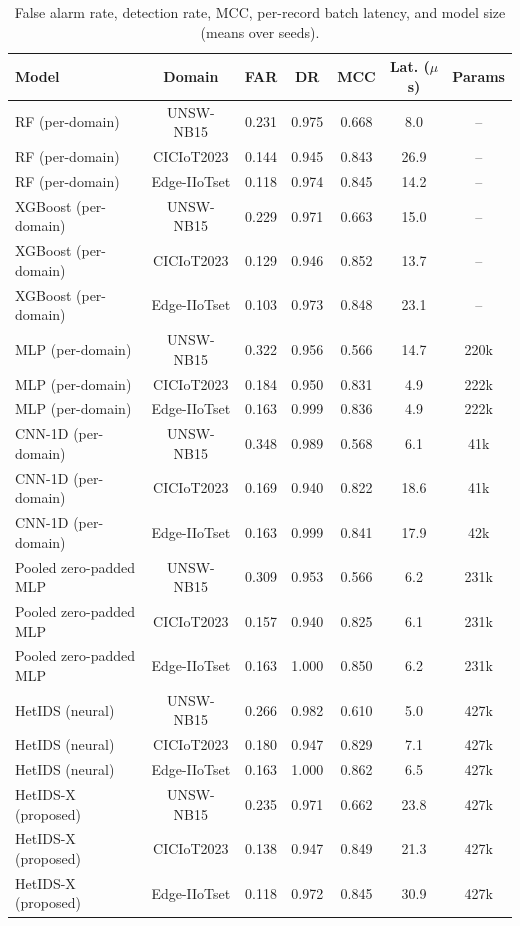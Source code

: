 \begin{table}[htbp]\centering\scriptsize
\caption{False alarm rate, detection rate, MCC, per-record batch latency, and model size (means over seeds).}
\label{tab:ops}
\begin{tabular}{lcccccc}
\toprule
Model & Domain & FAR & DR & MCC & Lat. ($\mu$s) & Params \\
\midrule
RF (per-domain) & UNSW-NB15 & 0.231 & 0.975 & 0.668 & 8.0 & -- \\
RF (per-domain) & CICIoT2023 & 0.144 & 0.945 & 0.843 & 26.9 & -- \\
RF (per-domain) & Edge-IIoTset & 0.118 & 0.974 & 0.845 & 14.2 & -- \\
XGBoost (per-domain) & UNSW-NB15 & 0.229 & 0.971 & 0.663 & 15.0 & -- \\
XGBoost (per-domain) & CICIoT2023 & 0.129 & 0.946 & 0.852 & 13.7 & -- \\
XGBoost (per-domain) & Edge-IIoTset & 0.103 & 0.973 & 0.848 & 23.1 & -- \\
MLP (per-domain) & UNSW-NB15 & 0.322 & 0.956 & 0.566 & 14.7 & 220k \\
MLP (per-domain) & CICIoT2023 & 0.184 & 0.950 & 0.831 & 4.9 & 222k \\
MLP (per-domain) & Edge-IIoTset & 0.163 & 0.999 & 0.836 & 4.9 & 222k \\
CNN-1D (per-domain) & UNSW-NB15 & 0.348 & 0.989 & 0.568 & 6.1 & 41k \\
CNN-1D (per-domain) & CICIoT2023 & 0.169 & 0.940 & 0.822 & 18.6 & 41k \\
CNN-1D (per-domain) & Edge-IIoTset & 0.163 & 0.999 & 0.841 & 17.9 & 42k \\
Pooled zero-padded MLP & UNSW-NB15 & 0.309 & 0.953 & 0.566 & 6.2 & 231k \\
Pooled zero-padded MLP & CICIoT2023 & 0.157 & 0.940 & 0.825 & 6.1 & 231k \\
Pooled zero-padded MLP & Edge-IIoTset & 0.163 & 1.000 & 0.850 & 6.2 & 231k \\
HetIDS (neural) & UNSW-NB15 & 0.266 & 0.982 & 0.610 & 5.0 & 427k \\
HetIDS (neural) & CICIoT2023 & 0.180 & 0.947 & 0.829 & 7.1 & 427k \\
HetIDS (neural) & Edge-IIoTset & 0.163 & 1.000 & 0.862 & 6.5 & 427k \\
HetIDS-X (proposed) & UNSW-NB15 & 0.235 & 0.971 & 0.662 & 23.8 & 427k \\
HetIDS-X (proposed) & CICIoT2023 & 0.138 & 0.947 & 0.849 & 21.3 & 427k \\
HetIDS-X (proposed) & Edge-IIoTset & 0.118 & 0.972 & 0.845 & 30.9 & 427k \\
\bottomrule
\end{tabular}
\end{table}